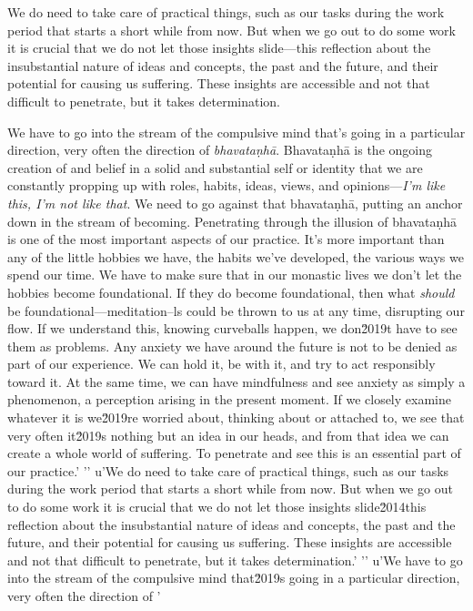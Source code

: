 We do need to take care of practical things, such as our tasks during 
the work period that starts a short while from now. But when we go out 
to do some work it is crucial that we do not let those insights 
slide---this reflection about the insubstantial nature of ideas and 
concepts, the past and the future, and their potential for causing us 
suffering. These insights are accessible and not that difficult to 
penetrate, but it takes determination.

We have to go into the stream of the compulsive mind that's going in a 
particular direction, very often the direction of \emph{bhavataṇhā}. 
Bhavataṇhā is the ongoing creation of and belief in a solid and 
substantial self or identity that we are constantly propping up with 
roles, habits, ideas, views, and opinions---\emph{I'm like this, I'm 
not like that}. We need to go against that bhavataṇhā, putting an 
anchor down in the stream of becoming. Penetrating through the illusion 
of bhavataṇhā is one of the most important aspects of our practice. 
It's more important than any of the little hobbies we have, the habits 
we've developed, the various ways we spend our time. We have to make 
sure that in our monastic lives we don't let the hobbies become 
foundational. If they do become foundational, then what \emph{should} 
be foundational---meditation--ls could be thrown to us at any time, disrupting our flow. If we understand this, knowing curveballs happen, we don\u2019t have to see them as problems. Any anxiety we have around the future is not to be denied as part of our experience. We can hold it, be with it, and try to act responsibly toward it. At the same time, we can have mindfulness and see anxiety as simply a phenomenon, a perception arising in the present moment. If we closely examine whatever it is we\u2019re worried about, thinking about or attached to, we see that very often it\u2019s nothing but an idea in our heads, and from that idea we can create a whole world of suffering. To penetrate and see this is an essential part of our practice.'
'\n'
u'We do need to take care of practical things, such as our tasks during the work period that starts a short while from now. But when we go out to do some work it is crucial that we do not let those insights slide\u2014this reflection about the insubstantial nature of ideas and concepts, the past and the future, and their potential for causing us suffering. These insights are accessible and not that difficult to penetrate, but it takes determination.'
'\n'
u'We have to go into the stream of the compulsive mind that\u2019s going in a particular direction, very often the direction of '
